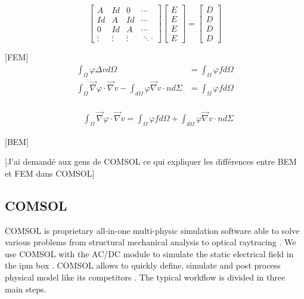 \begin{refsection}
	\begin{equation}
		\begin{bmatrix}
			A      & Id     & 0      & \cdots \\
			Id     & A      & Id     & \cdots \\
			0      & Id     & A      & \cdots \\
			\vdots & \vdots & \vdots & \ddots
			\cdot
		\end{bmatrix}
		\begin{bmatrix}
			E \\
			E \\
			E \\
			E
		\end{bmatrix}
		=
		\begin{bmatrix}
			D \\
			D \\
			D \\
			D
		\end{bmatrix}
	\end{equation}

	[FEM]
	\begin{align}
		\int_{\Omega}^{} \varphi \Delta v d\Omega                                                                             & = \int_{\Omega}^{} \varphi f d\Omega \\
		\int_{\Omega}^{} \vec{\nabla} \varphi \cdot \vec{\nabla} v - \int_{d\Omega}^{} \varphi \vec{\nabla} v \cdot n d\Sigma & = \int_{\Omega}^{} \varphi f d\Omega
	\end{align}

	\begin{align}                                                      \\
		 & \int_{\Omega}^{} \vec{\nabla} \varphi \cdot \vec{\nabla} v = \int_{\Omega}^{} \varphi f d\Omega + \int_{d\Omega}^{} \varphi \vec{\nabla} v \cdot n d\Sigma
	\end{align}

	[BEM]

	[J'ai demandé aux gens de COMSOL ce qui expliquer les différences entre BEM et FEM dans COMSOL]

	

	\subsection{COMSOL}
	COMSOL is proprietary all-in-one multi-physic simulation software able to solve various problems from structural mechanical analysis to optical raytracing \cite{comsol2018}. We use COMSOL with the AC/DC module to simulate the static electrical field in the \acrshort{ipm} box \cite{comsolacdc2018}. COMSOL allows to quickly define, simulate and post process physical model like its competitors \cite{cststudio2018,ansys2018,couloumb2018}. The typical workflow is divided in three main steps.


\end{refsection}
